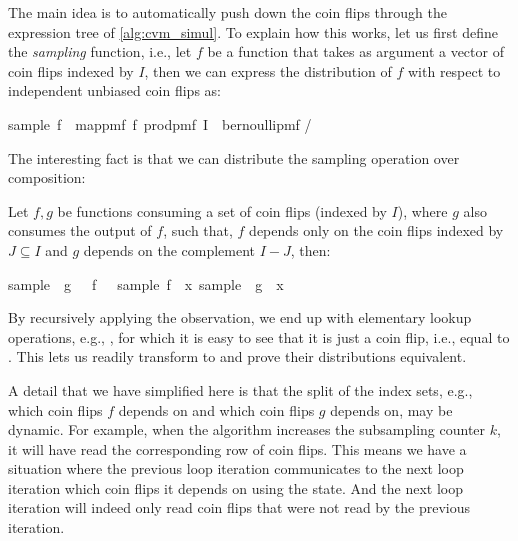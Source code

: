 The main idea is to automatically push down the coin flips through the expression tree of \cref{alg:cvm_simul}.
To explain how this works, let us first define the \emph{sampling} function, i.e., let $f$ be a function that takes as argument a vector of coin flips indexed by $I$, then we can express the distribution of $f$ with respect to independent unbiased coin flips as:
\begin{isabelle_cm}
  sample\ f\ \isacharequal\ map{\isacharunderscore}pmf\ f\ {\isacharparenleft}prod{\isacharunderscore}pmf\ I\ {\isacharparenleft}\isasymlambda\isacharunderscore\isachardot\ bernoulli{\isacharunderscore}pmf \isacharparenleft{}/\isacharparenright\isacharparenright\isacharparenright
\end{isabelle_cm}
The interesting fact is that we can distribute the sampling operation over composition:
\begin{observation}\label{o:sample_distrib} Let $f,g$ be functions consuming a set of coin flips (indexed by $I$), where $g$ also consumes the output of $f$, such that,
$f$ depends only on the coin flips indexed by $J \subseteq I$ and $g$ depends on the complement $I - J$, then:
\begin{isabelle_cm}
  sample\ \isacharparenleft\isasymlambda\isasymomega\isachardot\ g\ \isasymomega\ \isasymcirc\ f\ \isasymomega{\isacharparenright}\ \isacharequal\ sample\ f\ \isasymbind\ \isacharparenleft{\isasymlambda}x\isachardot\ sample\ \isacharparenleft\isasymlambda\isasymomega\isachardot\ g\ \isasymomega\ x\isacharparenright\isacharparenright
\end{isabelle_cm}
\end{observation}
By recursively applying the observation, we end up with elementary lookup operations, e.g., , for which it is easy to see that it is just a coin flip, i.e., equal to .
This lets us readily transform  to  and prove their distributions equivalent.

A detail that we have simplified here is that the split of the index sets, e.g., which coin flips $f$ depends on and which coin flips $g$ depends on, may be dynamic.
For example, when the algorithm increases the subsampling counter $k$, it will have read the corresponding row of coin flips.
This means we have a situation where the previous loop iteration communicates to the next loop iteration which coin flips it depends on using the state.
And the next loop iteration will indeed only read coin flips that were not read by the previous iteration.

